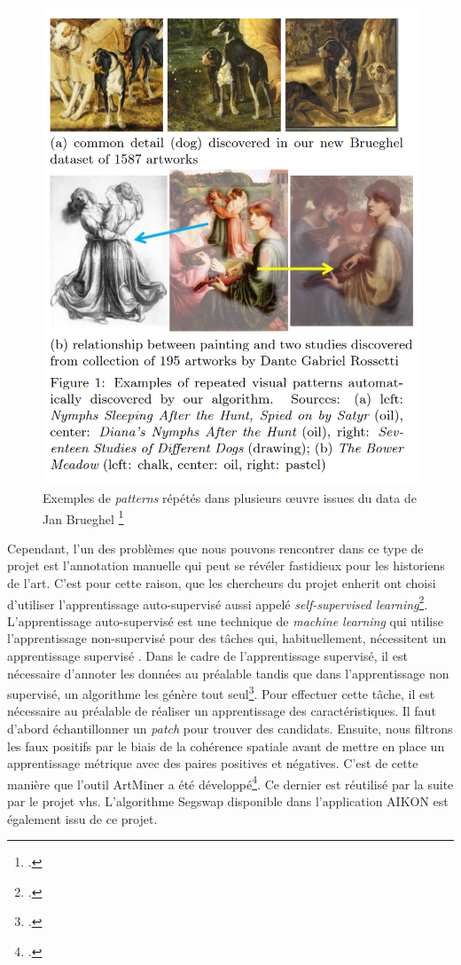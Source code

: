\begin{figure}[h]
	\centering
	\includegraphics[width=0.7\linewidth]{images/exemples_patterns_enherit.png}
	\caption{Exemples de \textit{patterns} répétés dans plusieurs œuvre issues du data de Jan Brueghel \footcite{shenDiscoveringVisualPatterns2019}}
	\label{fig:exemples_patterns_repetes}
\end{figure}

Cependant, l'un des problèmes que nous pouvons rencontrer dans ce type de projet est l'annotation manuelle qui peut se révéler fastidieux pour les historiens de l'art. C'est pour cette raison, que les chercheurs du projet \gls{enherit} ont choisi d'utiliser l'apprentissage auto-supervisé aussi appelé \textit{self-supervised learning}\footcite{shenDiscoveringVisualPatterns2019}.
L'apprentissage auto-supervisé est \og une technique de \textit{machine learning} qui utilise l'apprentissage non-supervisé pour des tâches qui, habituellement, nécessitent un apprentissage supervisé \fg. Dans le cadre de l'apprentissage supervisé, il est nécessaire d'annoter les données au préalable tandis que dans l'apprentissage non supervisé, un algorithme les génère tout seul\footcite{QuestceQueLapprentissage2023}.
Pour effectuer cette tâche, il est nécessaire au préalable de réaliser un apprentissage des caractéristiques. Il faut d'abord échantillonner un \textit{patch} pour trouver des candidats. Ensuite, nous filtrons les faux positifs par le biais de la cohérence spatiale avant de mettre en place un apprentissage métrique avec des paires positives et négatives. C'est de cette manière que l'outil ArtMiner a été développé\footcite{ArtMiner}. Ce dernier est réutilisé par la suite par le projet \gls{vhs}. 
L'algorithme Segswap disponible dans l'application AIKON est également issu de ce projet.

